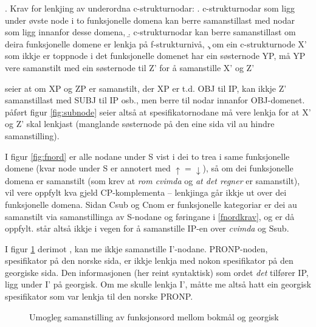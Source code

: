 \documentclass[11pt,a4paper,oneside,draft]{book}
\begin{document}
\ex. \label{subnodekrav} Krav for lenkjing av underordna
c-strukturnodar:
\a. c-strukturnodar som ligg under øvste node i to funksjonelle
    domena kan berre samanstillast med nodar som ligg innanfor desse
    domena,
\b. c-strukturnodar kan berre samanstillast om deira funksjonelle
    domene er lenkja på f-strukturnivå,
\c. om ein c-strukturnode X' som ikkje er toppnode i det funksjonelle
    domenet har ein søsternode YP, må YP vere samanstilt med ein
    søsternode til Z' for å samanstille X' og Z'


\Last[a] seier at om XP og ZP er samanstilt, der XP er t.d. OBJ til
IP, kan ikkje Z' samanstillast med SUBJ til IP osb., men berre til
nodar innanfor OBJ-domenet. \Last[c] påført figur \ref{fig:subnode}
seier altså at spesifikatornodane må vere lenkja for at X' og Z' skal
lenkjast (manglande søsternode på den eine sida vil au hindre
samanstilling).

I figur \ref{fig:fnord} er alle nodane under S vist i dei to trea i
same funksjonelle domene (kvar node under S er annotert med $\uparrow
= \downarrow$), så om dei funksjonelle domena er samanstilt (som krev
at \emph{rom cvimda} og \emph{at det regner} er samanstilt), vil \Last[a og -b]
vere oppfylt kva gjeld CP-komplementa -- lenkjinga går ikkje ut over
dei funksjonelle domena. Sidan Csub og Cnom er funksjonelle kategoriar
er dei au samanstilt via samanstillinga av S-nodane og føringane i
\ref{fnordkrav}, og \Last[c] er då oppfylt. \Last står altså ikkje i
vegen for å samanstille IP-en over \emph{cvimda} og Ssub.

I figur \ref{fig:ikkjesub} derimot \citep{mrs-suite}, kan me ikkje
samanstille I'-nodane. PRONP-noden, spesifikator på den norske sida,
er ikkje lenkja med nokon spesifikator på den georgiske sida. Den
informasjonen (her reint syntaktisk) som ordet \emph{det} tilfører IP, ligg
under I' på georgisk. Om me skulle lenkja I', måtte me altså hatt ein
georgisk spesifikator som var lenkja til den norske PRONP.

\begin{figure}[htp]
 \vfill{} %
\caption{Umogleg samanstilling av funksjonsord mellom bokmål og georgisk}
 \label{fig:ikkjesub}
\end{figure}
\end{document}
